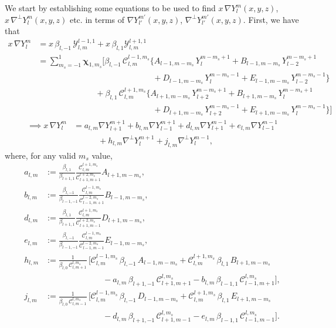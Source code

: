 \documentclass[11pt, oneside]{article}   	%
\newcommand{\gradY}{\nabla Y}
\newcommand{\gradYlm}{\nabla Y^m_l}
\newcommand{\gradpY}{\nabla^\perp Y}
\newcommand{\gradpYlm}{\nabla^\perp Y^m_l}
\newcommand{\curlyy}{\bm{\mathcal{Y}}}
\newcommand{\blone}{\beta_{l, 1}}
\newcommand{\blzero}{\beta_{l, 0}}
\newcommand{\blmone}{\beta_{l, -1}}
\newcommand{\chivec}{\bm{\chi}_{1,m_s}}
\newcommand{\cgcoeff}{\mathcal{C}}
\newcommand{\alm}{a_{l,m}}
\newcommand{\blm}{b_{l,m}}
\newcommand{\dlm}{d_{l,m}}
\newcommand{\elm}{e_{l,m}}
\newcommand{\hlm}{h_{l,m}}
\newcommand{\jlm}{j_{l,m}}
\begin{document}
We start by establishing some equations to be used to find \(x \,\gradYlm (x,y,z)\), \(x \,\gradpYlm (x,y,z)\) etc. in terms of \(\gradY^{m'}_{l'} (x,y,z)\), \(\gradpY^{m'}_{l'} (x,y,z)\). First, we have that
\begin{align}
x \,\gradYlm 
&= x \, \blmone \, \curlyy^{l-1,1}_{l,m} + x \, \blone \curlyy^{l+1,1}_{l,m} \nonumber
\\
&= \sum_{m_s=-1}^{1} \chivec \Big[ \blmone \, \cgcoeff^{l-1,m_s}_{l,m} \big\{ A_{l-1,m-m_s} \, Y^{m-m_s+1}_{l} + B_{l-1,m-m_s} \, Y^{m-m_s+1}_{l-2} \nonumber \\ 
& \quad \quad \quad \quad \quad \quad \quad \quad \quad \quad \quad \quad \quad \quad + D_{l-1,m-m_s} \, Y^{m-m_s-1}_{l} + E_{l-1,m-m_s} \, Y^{m-m_s-1}_{l-2} \big\} \nonumber \\
& \quad \quad \quad \quad \quad \quad \quad + \blone \, \cgcoeff^{l+1,m_s}_{l,m} \big\{ A_{l+1,m-m_s} \, Y^{m-m_s+1}_{l+2} + B_{l+1,m-m_s} \, Y^{m-m_s+1}_{l} \nonumber \\ 
& \quad \quad \quad \quad \quad \quad \quad \quad \quad \quad \quad \quad \quad \quad + D_{l+1,m-m_s} \, Y^{m-m_s-1}_{l+2} + E_{l+1,m-m_s} \, Y^{m-m_s-1}_{l} \big\} \Big]
\end{align}
\begin{align}
\implies x \,\gradYlm &= \alm \gradY^{m+1}_{l+1} + \blm \gradY^{m+1}_{l-1} + \dlm \gradY^{m-1}_{l+1} + \elm \gradY^{m-1}_{l-1} \nonumber \\
& \quad \quad \quad + \hlm \gradpY^{m+1}_{l} + \jlm \gradpY^{m-1}_{l},
\end{align}
where, for any valid \(m_s\) value,
\begin{align}
\alm &:= \frac{\blone}{\beta_{l+1,1}} \frac{\cgcoeff^{l+1,m_s}_{l,m}}{\cgcoeff^{l+2,m_s}_{l+1,m+1}} A_{l+1,m-m_s}, \\
\blm &:= \frac{\blmone}{\beta_{l-1,-1}} \frac{\cgcoeff^{l-1,m_s}_{l,m}}{\cgcoeff^{l-2,m_s}_{l-1,m+1}} B_{l-1,m-m_s}, \\
\dlm &:= \frac{\blone}{\beta_{l+1,1}} \frac{\cgcoeff^{l+1,m_s}_{l,m}}{\cgcoeff^{l+2,m_s}_{l+1,m-1}} D_{l+1,m-m_s}, \\
\elm &:= \frac{\blmone}{\beta_{l-1,-1}} \frac{\cgcoeff^{l-1,m_s}_{l,m}}{\cgcoeff^{l-2,m_s}_{l-1,m-1}} E_{l-1,m-m_s}, \\
\hlm &:= \frac{1}{\blzero \, \cgcoeff^{l,m_s}_{l, m+1}} \, \Big[ \cgcoeff^{l-1,m_s}_{l,m} \, \blmone \, A_{l-1,m-m_s} + \cgcoeff^{l+1,m_s}_{l,m} \, \blone \, B_{l+1,m-m_s} \nonumber \\
& \quad \quad \quad \quad \quad \quad \quad - \alm \, \beta_{l+1,-1} \, \cgcoeff^{l,m_s}_{l+1,m+1} - \blm \, \beta_{l-1,1} \, \cgcoeff^{l,m_s}_{l-1,m+1} \Big], \\
\jlm &:= \frac{1}{\blzero \, \cgcoeff^{l,m_s}_{l, m-1}} \, \Big[ \cgcoeff^{l-1,m_s}_{l,m} \, \blmone \, D_{l-1,m-m_s} + \cgcoeff^{l+1,m_s}_{l,m} \, \blone \, E_{l+1,m-m_s} \nonumber \\
& \quad \quad \quad \quad \quad \quad \quad - \dlm \, \beta_{l+1,-1} \, \cgcoeff^{l,m_s}_{l+1,m-1} - \elm \, \beta_{l-1,1} \, \cgcoeff^{l,m_s}_{l-1,m-1} \Big].
\end{align}
\end{document}
